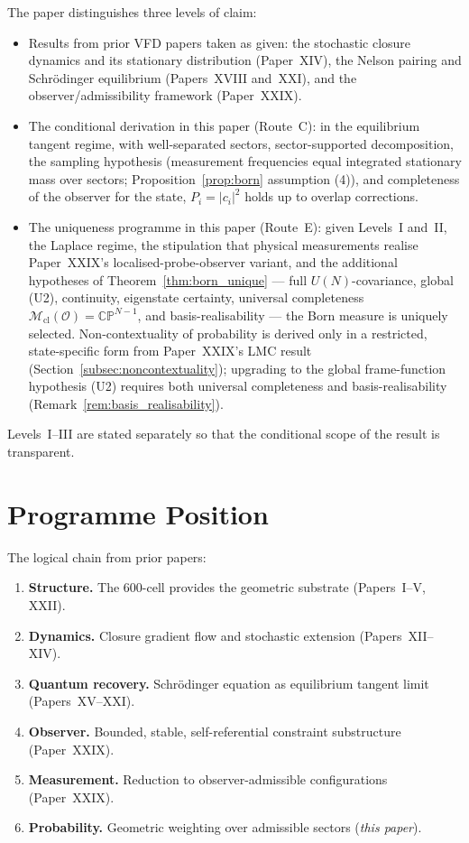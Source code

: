 \documentclass[12pt]{article}
\newcommand{\Ocal}{\mathcal{O}}
\newcommand{\Mcl}{\mathcal{M}_{\mathrm{cl}}}
\begin{document}
The paper distinguishes three levels of claim:
\begin{itemize}
    \item[\textbf{Level I.}] Results from prior VFD papers taken as given: the stochastic closure dynamics and its stationary distribution (Paper~XIV), the Nelson pairing and Schr\"odinger equilibrium (Papers~XVIII and~XXI), and the observer/admissibility framework (Paper~XXIX).
    \item[\textbf{Level II.}] The conditional derivation in this paper (Route~C): in the equilibrium tangent regime, with well-separated sectors, sector-supported decomposition, the sampling hypothesis (measurement frequencies equal integrated stationary mass over sectors; Proposition~\ref{prop:born} assumption (4)), and completeness of the observer for the state, $P_i = |c_i|^2$ holds up to overlap corrections.
    \item[\textbf{Level III.}] The uniqueness programme in this paper (Route~E): given Levels~I and~II, the Laplace regime, the stipulation that physical measurements realise Paper~XXIX's localised-probe-observer variant, and the additional hypotheses of Theorem~\ref{thm:born_unique} --- full $U(N)$-covariance, global (U2), continuity, eigenstate certainty, universal completeness $\Mcl(\Ocal) = \mathbb{CP}^{N-1}$, and basis-realisability --- the Born measure is uniquely selected. Non-contextuality of probability is derived only in a restricted, state-specific form from Paper~XXIX's LMC result (Section~\ref{subsec:noncontextuality}); upgrading to the global frame-function hypothesis (U2) requires both universal completeness and basis-realisability (Remark~\ref{rem:basis_realisability}).
\end{itemize}
Levels~I--III are stated separately so that the conditional scope of the result is transparent.

\section{Programme Position}\label{sec:position}

The logical chain from prior papers:

\begin{enumerate}
    \item \textbf{Structure.} The 600-cell provides the geometric substrate (Papers~I--V, XXII).
    \item \textbf{Dynamics.} Closure gradient flow and stochastic extension (Papers~XII--XIV).
    \item \textbf{Quantum recovery.} Schr\"odinger equation as equilibrium tangent limit (Papers~XV--XXI).
    \item \textbf{Observer.} Bounded, stable, self-referential constraint substructure (Paper~XXIX).
    \item \textbf{Measurement.} Reduction to observer-admissible configurations (Paper~XXIX).
    \item \textbf{Probability.} Geometric weighting over admissible sectors (\textit{this paper}).
\end{enumerate}
\end{document}
